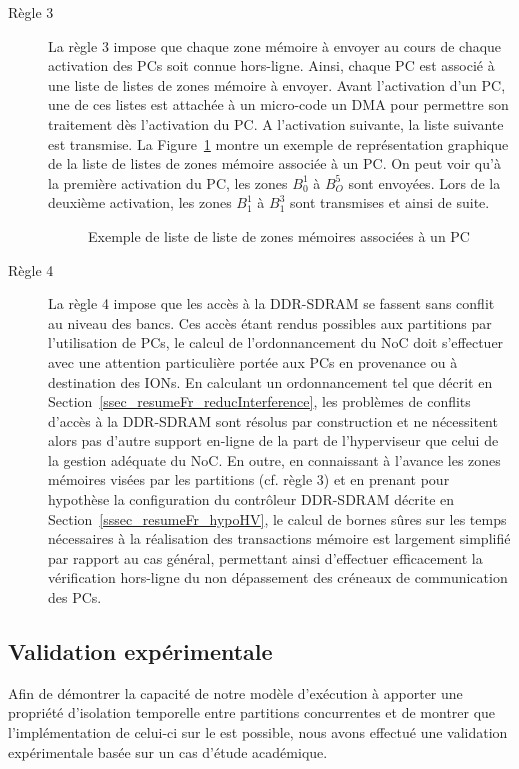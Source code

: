 \documentclass[main.tex]{subfiles}
\begin{document}
\begin{description}
    \item[Règle 3]
        La règle 3 impose que chaque zone mémoire à envoyer au cours de chaque activation des PCs soit connue hors-ligne. Ainsi, chaque PC est associé à une liste de listes de zones mémoire à envoyer. Avant l'activation d'un PC, une de ces listes est attachée à un micro-code un DMA pour permettre son traitement dès l'activation du PC. A l'activation suivante, la liste suivante est transmise. La Figure~\ref{fig_resumeFr_exBufferQueues} montre un exemple de représentation graphique de la liste de listes de zones mémoire associée à un PC. On peut voir qu'à la première activation du PC, les zones $B_0^1$ à $B_O^5$ sont envoyées. Lors de la deuxième activation, les zones $B_1^1$ à $B_1^3$ sont transmises et ainsi de suite.
            \begin{figure}
                \centering
                \scalebox{0.75}{}
                \caption{Exemple de liste de liste de zones mémoires associées à un PC}
                \label{fig_resumeFr_exBufferQueues}
            \end{figure}


    \item[Règle 4]
        La règle 4 impose que les accès à la DDR-SDRAM se fassent sans conflit au niveau des bancs. Ces accès étant rendus possibles aux partitions par l'utilisation de PCs, le calcul de l'ordonnancement du NoC doit s'effectuer avec une attention particulière portée aux PCs en provenance ou à destination des IONs. En calculant un ordonnancement tel que décrit en Section~\ref{ssec_resumeFr_reducInterference}, les problèmes de conflits d'accès à la DDR-SDRAM sont résolus par construction et ne nécessitent alors pas d'autre support en-ligne de la part de l'hyperviseur que celui de la gestion adéquate du NoC. En outre, en connaissant à l'avance les zones mémoires visées par les partitions (cf. règle 3) et en prenant pour hypothèse la configuration du contrôleur DDR-SDRAM décrite en Section~\ref{sssec_resumeFr_hypoHV}, le calcul de bornes sûres sur les temps nécessaires à la réalisation des transactions mémoire est largement simplifié par rapport au cas général, permettant ainsi d'effectuer efficacement la vérification hors-ligne du non dépassement des créneaux de communication des PCs.
\end{description}

\subsection{Validation expérimentale}
Afin de démontrer la capacité de notre modèle d'exécution à apporter une propriété d'isolation temporelle entre partitions concurrentes et de montrer que l'implémentation de celui-ci sur le \mppalong est possible, nous avons effectué une validation expérimentale basée sur un cas d'étude académique.
\end{document}
